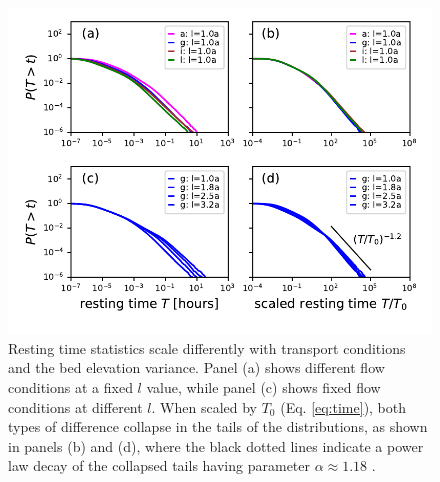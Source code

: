 \begin{figure}[!htbp]
	\includegraphics[width=\linewidth,keepaspectratio]{./figures/ch3/rtcdf.pdf}
	\caption{Resting time statistics scale differently with transport conditions and the bed elevation variance. Panel (a) shows different flow conditions at a fixed $l$ value, while panel (c) shows fixed flow conditions at different $l$. When scaled by $T_0$ (Eq. \ref{eq:time}), both types of difference collapse in the tails of the distributions, as shown in panels (b) and (d), where the black dotted lines indicate a power law decay of the collapsed tails having parameter $\alpha\approx1.18$ .}
	\label{fig:cdfs}
\end{figure}

